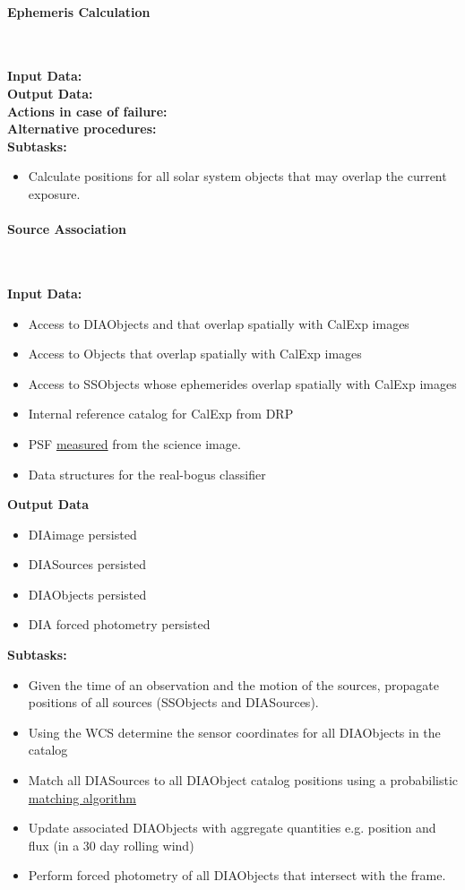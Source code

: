 \paragraph{Ephemeris Calculation}~

\noindent
{\bf Input Data:}\\
{\bf Output Data:}\\
{\bf Actions in case of failure:}\\
{\bf Alternative procedures:}\\

\noindent
{\bf Subtasks:}
\begin{itemize}
\item Calculate positions for all solar system objects that may overlap the current exposure.
\end{itemize}

\paragraph{Source Association}~

{\bf Input Data:}\\
\begin{itemize}
\item Access to DIAObjects and that overlap spatially with CalExp images 
\item Access to Objects that overlap spatially  with CalExp images 
\item Access to SSObjects whose ephemerides overlap spatially  with CalExp images 
\item Internal reference catalog for CalExp from DRP 
\item PSF \hyperref[sec:apSingleFrameProcessing]{measured} from the
  science image.
\item Data structures for the real-bogus classifier
\end{itemize}


{\bf Output Data}\\
\begin{itemize}
\item DIAimage persisted
\item DIASources persisted
\item DIAObjects persisted
\item DIA forced photometry persisted
\end{itemize}
\noindent
{\bf Subtasks:}
\begin{itemize}
\item Given the time of an observation and the motion of the sources,
  propagate positions of all sources (SSObjects and DIASources).
\item Using the WCS determine the sensor coordinates for all
  DIAObjects in the catalog
\item Match all DIASources to all DIAObject catalog positions using a probabilistic \hyperref[sec:acDIAObjectGeneration]{matching algorithm}
\item Update associated DIAObjects with aggregate quantities
  e.g. position and flux (in a 30 day rolling wind)
\item Perform forced photometry of all DIAObjects that intersect with
  the frame.
\end{itemize}


